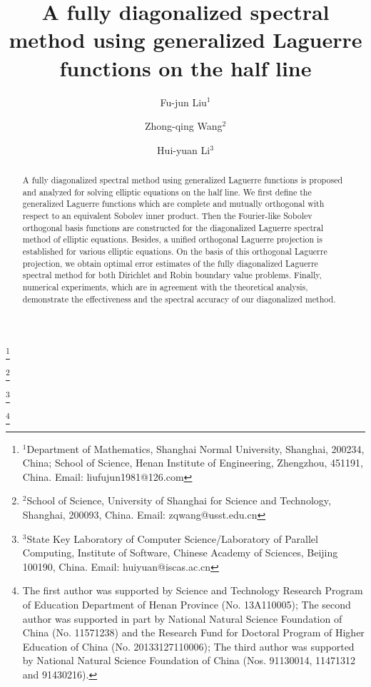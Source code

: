 \documentclass[10pt,reqno]{amsart}
\theoremstyle{remark}
\theoremstyle{definition}
\begin{document}

\title[Laguerre spectral method]
{A fully diagonalized spectral method using generalized Laguerre functions on the half line
}
\author[F. Liu]{Fu-jun Liu$^{1}$}
\thanks{$^{1}$Department of Mathematics, Shanghai Normal
University, Shanghai, 200234, China; School of Science, Henan Institute of Engineering, Zhengzhou, 451191, China. Email: liufujun1981@126.com}

\author[Z. Wang]{Zhong-qing Wang$^{2}$}
\thanks{$^{2}$School of Science, University of Shanghai for Science and Technology, Shanghai, 200093, China. Email: zqwang@usst.edu.cn}

\author[H. Li]{Hui-yuan Li$^{3}$}
\thanks{$^{3}$State Key Laboratory of Computer Science/Laboratory of Parallel Computing,  Institute of Software, Chinese Academy of Sciences, Beijing 100190, China. Email: huiyuan@iscas.ac.cn}

 

\thanks{The first author was supported by Science and Technology Research Program of Education Department of Henan Province (No. 13A110005);
The second author was supported in part by National Natural Science
Foundation of China (No. 11571238) and the Research Fund for
Doctoral Program of Higher Education of China (No. 20133127110006);
The third author was supported by National Natural Science Foundation of China (Nos. 91130014, 11471312 and 91430216).}
\begin{abstract}
A fully diagonalized spectral method using generalized Laguerre functions
is proposed and analyzed  for solving elliptic equations on the half line.
We  first define  the generalized Laguerre functions which are complete and
mutually orthogonal  with respect to an equivalent Sobolev inner product.
Then the Fourier-like Sobolev orthogonal basis functions are constructed
for the  diagonalized Laguerre spectral method  of elliptic equations.
Besides,
a unified  orthogonal Laguerre projection is established
for various  elliptic equations.
On the basis of this orthogonal Laguerre projection, we obtain optimal error  estimates
of the fully diagonalized Laguerre spectral method for both Dirichlet and Robin
boundary value problems. Finally, numerical experiments, which are in agreement with the
theoretical analysis, demonstrate the effectiveness and the spectral accuracy of
our diagonalized method.
\end{abstract}
\maketitle
\end{document}

